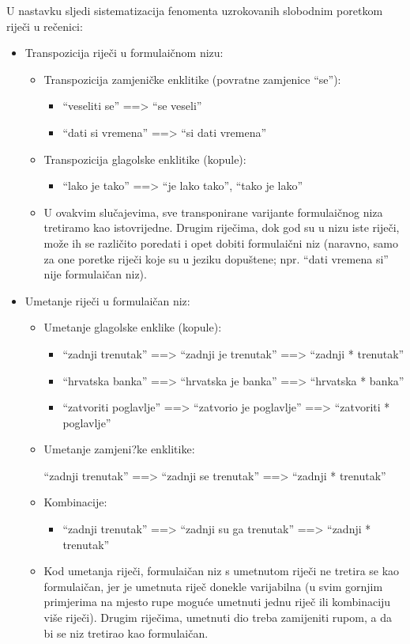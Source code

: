 \documentclass[12pt]{article}
\begin{document}
U nastavku sljedi sistematizacija fenomenta uzrokovanih slobodnim poretkom riječi u rečenici:

\begin{itemize}

\item Transpozicija riječi u formulaičnom nizu:
\begin{itemize}
\item Transpozicija zamjeničke enklitike (povratne zamjenice ``se''):
\begin{itemize}
\item ``veseliti se'' ==> ``se veseli''
\item  ``dati si vremena'' ==> ``si dati vremena''
\end{itemize}
\item Transpozicija glagolske enklitike (kopule):
\begin{itemize}
\item ``lako je tako'' ==> ``je lako tako'', ``tako je lako''
\end{itemize}
\item U ovakvim slučajevima, sve transponirane varijante formulaičnog niza tretiramo kao
istovrijedne. Drugim riječima, dok god su u nizu iste riječi, može ih se različito poredati i opet
dobiti formulaični niz (naravno, samo za one poretke riječi koje su u jeziku dopuštene; npr.
``dati vremena si'' nije formulaičan niz).
\end{itemize}

\item Umetanje riječi u formulaičan niz:

\begin{itemize}
\item Umetanje glagolske enklike (kopule):
\begin{itemize}
\item ``zadnji trenutak'' ==> ``zadnji je trenutak'' ==> ``zadnji * trenutak''
\item ``hrvatska banka'' ==> ``hrvatska je banka'' ==> ``hrvatska * banka''
\item ``zatvoriti poglavlje'' ==> ``zatvorio je poglavlje'' ==> ``zatvoriti * poglavlje''
\end{itemize} 
\item Umetanje zamjeni?ke enklitike:
\begin{itemize}
``zadnji trenutak'' ==> ``zadnji se trenutak'' ==> ``zadnji * trenutak''
\end{itemize}
\item Kombinacije:
\begin{itemize}
\item ``zadnji trenutak'' ==> ``zadnji su ga trenutak'' ==> ``zadnji * trenutak''
\end{itemize}
\item Kod umetanja riječi, formulaičan niz s umetnutom riječi ne tretira se kao formulaičan, jer je
umetnuta riječ donekle varijabilna (u svim gornjim primjerima na mjesto rupe moguće umetnuti
jednu riječ ili kombinaciju više riječi). Drugim riječima, umetnuti dio treba zamijeniti rupom, a
da bi se niz tretirao kao formulaičan.
\end{itemize}
\end{itemize}
\end{document}
